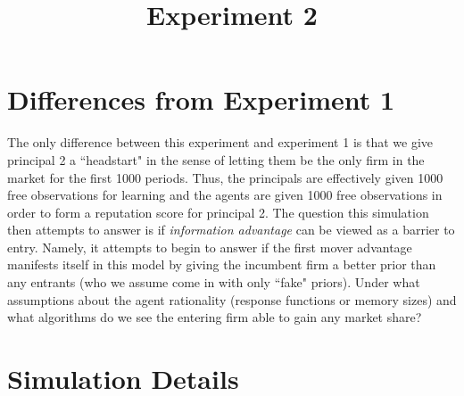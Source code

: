 \documentclass[11pt,letterpaper]{article}
\begin{document}
 

\title{Experiment 2}
\maketitle

\section*{Differences from Experiment 1}

The only difference between this experiment and experiment 1 is that we give principal 2 a ``headstart" in the sense of letting them be the only firm in the market for the first 1000 periods. Thus, the principals are effectively given 1000 free observations for learning and the agents are given 1000 free observations in order to form a reputation score for principal 2. The question this simulation then attempts to answer is if \textit{information advantage} can be viewed as a barrier to entry. Namely, it attempts to begin to answer if the first mover advantage manifests itself in this model by giving the incumbent firm a better prior than any entrants (who we assume come in with only ``fake" priors). Under what assumptions about the agent rationality (response functions or memory sizes) and what algorithms do we see the entering firm able to gain any market share?
\section*{Simulation Details}
\end{document}
